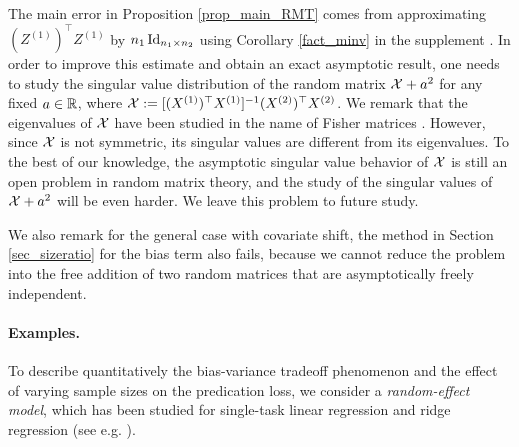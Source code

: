 \begin{remark}
The main error in Proposition \ref{prop_main_RMT} comes from approximating $(Z^{(1)})^\top Z^{(1)}$ by $n_1\id_{n_1\times n_2}$ using Corollary \ref{fact_minv} in the supplement \cite{MTL_suppl}. In order to improve this estimate and obtain an exact asymptotic result, one needs to study the singular value distribution of the  random matrix $\cal X + a^2$ for any fixed $a\in \R$, where $\cal X:=[(X^{(1)})^{\top}X^{(1)}]^{-1}(X^{(2)})^{\top}X^{(2)}$. We remark that the eigenvalues of $\cal X$ have been studied in the name of Fisher matrices \cite{Fmatrix}. However, since $\cal X$ is not symmetric, its singular values are different from its eigenvalues. To the best of our knowledge, the asymptotic singular value behavior of $\cal X$ is still an open problem in random matrix theory, and the study of the singular values of $\cal X + a^2$ will be even harder. We leave this problem to future study.

We also remark for the general case with covariate shift, the method in Section \ref{sec_sizeratio} for the bias term also fails, because we cannot reduce the problem into the free addition of two random matrices that are asymptotically freely independent.
\end{remark}


\paragraph{Examples.}
To describe quantitatively the bias-variance tradeoff phenomenon and the effect of varying sample sizes on the predication loss, we consider a \emph{random-effect model}, which has been studied for  single-task linear regression and ridge regression (see e.g. \cite{dobriban2020wonder,dobriban2018high}).

